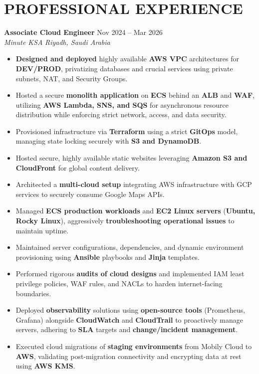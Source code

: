 \documentclass[10pt,a4paper]{article}
\newcommand{\jobheading}[4]{
  \vspace{0.2ex}\noindent
  \textbf{#1} \hfill #2 \\
  \textit{#3} \hfill \textit{#4} \vspace{0.2ex}
}
\begin{document}
\section*{PROFESSIONAL EXPERIENCE}

\jobheading{Associate Cloud Engineer}{Nov 2024 -- Mar 2026}{Minute KSA}{Riyadh, Saudi Arabia}
\begin{itemize}[leftmargin=*,itemsep=1pt,parsep=0pt]
\item \textbf{Designed and deployed} highly available \textbf{AWS VPC} architectures for \textbf{DEV/PROD}, privatizing databases and crucial services using private subnets, NAT, and Security Groups.
\item Hosted a secure \textbf{monolith application} on \textbf{ECS} behind an \textbf{ALB} and \textbf{WAF}, utilizing \textbf{AWS Lambda, SNS, and SQS} for asynchronous resource distribution while enforcing strict network, access, and data security.
\item Provisioned infrastructure via \textbf{Terraform} using a strict \textbf{GitOps} model, managing state locking securely with \textbf{S3 and DynamoDB}.
\item Hosted secure, highly available static websites leveraging \textbf{Amazon S3 and CloudFront} for global content delivery.
\item Architected a \textbf{multi-cloud setup} integrating AWS infrastructure with GCP services to securely consume Google Maps APIs.
\item Managed \textbf{ECS production workloads} and \textbf{EC2 Linux servers} (\textbf{Ubuntu, Rocky Linux}), aggressively \textbf{troubleshooting operational issues} to maintain uptime.
\item Maintained server configurations, dependencies, and dynamic environment provisioning using \textbf{Ansible} playbooks and \textbf{Jinja} templates.
\item Performed rigorous \textbf{audits of cloud designs} and implemented IAM least privilege policies, WAF rules, and NACLs to harden internet-facing boundaries.
\item Deployed \textbf{observability} solutions using \textbf{open-source tools} (Prometheus, Grafana) alongside \textbf{CloudWatch} and \textbf{CloudTrail} to proactively manage servers, adhering to \textbf{SLA} targets and \textbf{change/incident management}.
\item Executed cloud migrations of \textbf{staging environments} from Mobily Cloud to \textbf{AWS}, validating post-migration connectivity and encrypting data at rest using \textbf{AWS KMS}.

\end{itemize}
\end{document}
